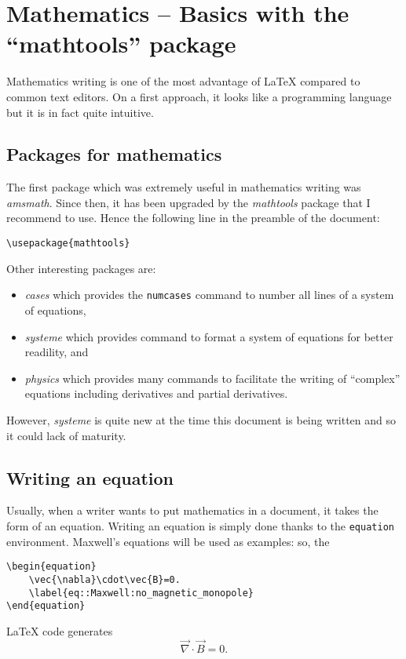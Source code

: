 

\chapter{Mathematics -- Basics with the \enquote{mathtools} package}

	\label{cha::maths:basics}


Mathematics writing is one of the most advantage of \LaTeX{} compared to common text editors.
On a first approach, it looks like a programming language but it is in fact quite intuitive.



\section{Packages for mathematics}


	The first package which was extremely useful in mathematics writing was \emph{amsmath}.
	Since then, it has been upgraded by the \emph{mathtools} package that I recommend to use.
	Hence the following line in the preamble of the document:
\begin{lstlisting}[language={[LaTeX]TeX}]
\usepackage{mathtools}
\end{lstlisting}


	Other interesting packages are:
	\begin{itemize}
		\item \emph{cases} which provides the \texttt{numcases} command to number all lines of a system of equations,
		\item \emph{systeme} which provides command to format a system of equations for better readility, and
		\item \emph{physics} which provides many commands to facilitate the writing of \enquote{complex} equations including derivatives and partial derivatives.
	\end{itemize}
	However, \emph{systeme} is quite new at the time this document is being written and so it could lack of maturity.



\section{Writing an equation}


	Usually, when a writer wants to put mathematics in a document, it takes the form of an equation.
	Writing an equation is simply done thanks to the \texttt{equation} environment.
	Maxwell's equations will be used as examples: so, the 
\begin{lstlisting}[language={[LaTeX]TeX}]
\begin{equation}
	\vec{\nabla}\cdot\vec{B}=0.
	\label{eq::Maxwell:no_magnetic_monopole}
\end{equation}
\end{lstlisting}
	\LaTeX{} code generates
	\begin{equation}
		\vec{\nabla}\cdot\vec{B}=0.
		\label{eq::Maxwell:no_magnetic_monopole}
	\end{equation}
	
